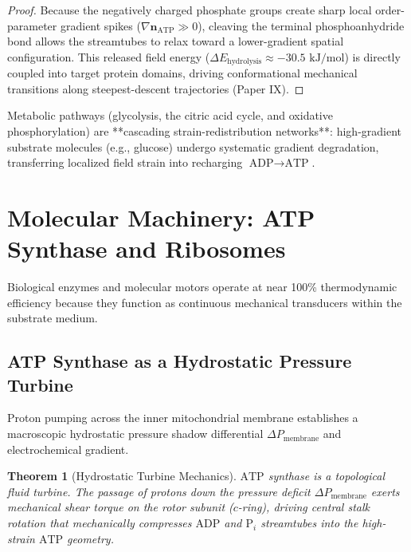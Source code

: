 \documentclass[11pt,a4paper]{article}
\newtheorem{thm}{Theorem}
\begin{document}
	\begin{proof}
		Because the negatively charged phosphate groups create sharp local order-parameter gradient spikes ($\nabla \mathbf{n}_{\text{ATP}} \gg 0$), cleaving the terminal phosphoanhydride bond allows the streamtubes to relax toward a lower-gradient spatial configuration. This released field energy ($\Delta E_{\text{hydrolysis}} \approx -30.5 \text{ kJ/mol}$) is directly coupled into target protein domains, driving conformational mechanical transitions along steepest-descent trajectories (Paper IX).
	\end{proof}
	
	Metabolic pathways (glycolysis, the citric acid cycle, and oxidative phosphorylation) are **cascading strain-redistribution networks**: high-gradient substrate molecules (e.g., glucose) undergo systematic gradient degradation, transferring localized field strain into recharging $\text{ADP} \to \text{ATP}$.
	
	\section{Molecular Machinery: ATP Synthase and Ribosomes}
	\label{sec:molecular_machinery}
	
	Biological enzymes and molecular motors operate at near 100\% thermodynamic efficiency because they function as continuous mechanical transducers within the substrate medium.
	
	\subsection{ATP Synthase as a Hydrostatic Pressure Turbine}
	Proton pumping across the inner mitochondrial membrane establishes a macroscopic hydrostatic pressure shadow differential $\Delta P_{\text{membrane}}$ and electrochemical gradient.
	
	\begin{thm}[Hydrostatic Turbine Mechanics]
		\label{thm:atp_synthase}
		$\text{ATP}$ synthase is a topological fluid turbine. The passage of protons down the pressure deficit $\Delta P_{\text{membrane}}$ exerts mechanical shear torque on the rotor subunit ($c$-ring), driving central stalk rotation that mechanically compresses $\text{ADP}$ and $\text{P}_i$ streamtubes into the high-strain $\text{ATP}$ geometry.
	\end{thm}
	
\end{document}
